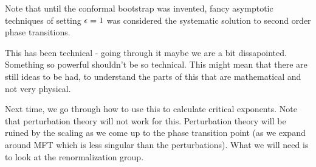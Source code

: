 Note that until the conformal bootstrap was invented, fancy asymptotic techniques of setting $\epsilon = 1$ was considered the systematic solution to second order phase transitions. 

This has been technical - going through it maybe we are a bit dissapointed. Something so powerful shouldn't be so technical. This might mean that there are still ideas to be had, to understand the parts of this that are mathematical and not very physical. 

Next time, we go through how to use this to calculate critical exponents. Note that perturbation theory will not work for this. Perturbation theory will be ruined by the scaling as we come up to the phase transition point (as we expand around MFT which is less singular than the perturbations). What we will need is to look at the renormalization group.